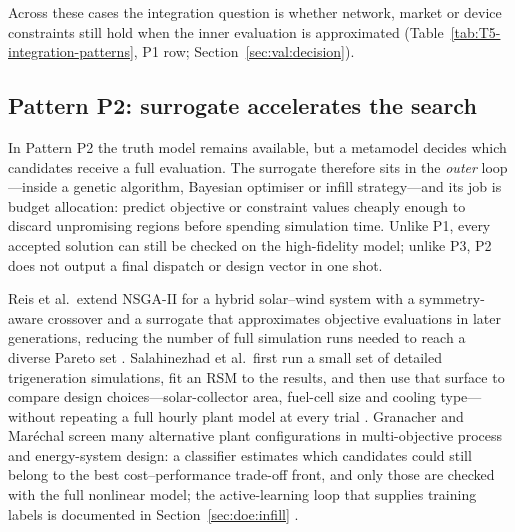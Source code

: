 Across these cases the integration question is whether network,
market or device constraints still hold when the inner evaluation is
approximated (Table~\ref{tab:T5-integration-patterns}, P1 row;
Section~\ref{sec:val:decision}).

\subsection{Pattern P2: surrogate accelerates the search}
\label{sec:int:accelerate}

In Pattern P2 the truth model remains available, but a metamodel
decides which candidates receive a full evaluation.
The surrogate therefore sits in the \emph{outer} loop---inside a genetic
algorithm, Bayesian optimiser or infill strategy---and its job is budget
allocation: predict objective or constraint values cheaply enough to
discard unpromising regions before spending simulation time.
Unlike P1, every accepted solution can still be checked on the
high-fidelity model; unlike P3, P2 does not output a final dispatch or
design vector in one shot.

Reis et al.\ extend NSGA-II for a hybrid solar--wind system with a
symmetry-aware crossover and a surrogate that approximates objective
evaluations in later generations, reducing the number of full
simulation runs needed to reach a diverse Pareto set
\cite{Reis2025}. Salahinezhad et al.\ first run a small set of detailed
trigeneration simulations, fit an RSM to the results, and then use that
surface to compare design choices---solar-collector area, fuel-cell size
and cooling type---without repeating a full hourly plant model at every
trial \cite{Salahinezhad2025}. Granacher and
Mar\'echal screen many alternative plant configurations in
multi-objective process and energy-system design: a classifier estimates
which candidates could still belong to the best cost--performance
trade-off front, and only those are checked with the full nonlinear
model; the active-learning loop that supplies training labels is
documented in Section~\ref{sec:doe:infill}
\cite{Granacher20221573}.

